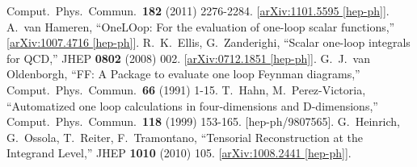 \documentclass[a4paper]{article}
\begin{document}
\begin{thebibliography}{ABC}
  Comput.\ Phys.\ Commun.\  {\bf 182 } (2011)  2276-2284.
  [\href{http://arxiv.org/abs/1101.5595}{arXiv:1101.5595 [hep-ph]}].
  A.~van Hameren,
  ``OneLOop: For the evaluation of one-loop scalar functions,''
  [\href{http://arxiv.org/abs/1007.4716}{arXiv:1007.4716 [hep-ph]}].
  R.~K.~Ellis, G.~Zanderighi,
  ``Scalar one-loop integrals for QCD,''
  JHEP {\bf 0802 } (2008)  002.
  [\href{http://arxiv.org/abs/0712.1851}{arXiv:0712.1851 [hep-ph]}].
  G.~J.~van Oldenborgh,
  ``FF: A Package to evaluate one loop Feynman diagrams,''
  Comput.\ Phys.\ Commun.\  {\bf 66 } (1991)  1-15.
  T.~Hahn, M.~Perez-Victoria,
  ``Automatized one loop calculations in four-dimensions and D-dimensions,''
  Comput.\ Phys.\ Commun.\  {\bf 118 } (1999)  153-165.
  [hep-ph/9807565].
  G.~Heinrich, G.~Ossola, T.~Reiter, F.~Tramontano,
  ``Tensorial Reconstruction at the Integrand Level,''
  JHEP {\bf 1010 } (2010)  105.
  [\href{http://arxiv.org/abs/1008.2441}{arXiv:1008.2441 [hep-ph]}].
\end{thebibliography}
\end{document}
